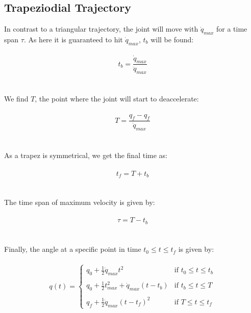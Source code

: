 \documentclass{article}
\begin{document}
	\subsection{Trapeziodial Trajectory}
	In contrast to a triangular trajectory, the joint will move with $\dot{q}_{max}$ for a time span $\tau$. As here it is guaranteed to hit $\dot{q}_{max}$, $t_{b}$ will be found:\\\\
	\begin{equation}
	t_{b} = \frac{\dot{q}_{max}}{\ddot{q}_{max}}
	\end{equation}\\\\
	We find $T$, the point where the joint will start to deaccelerate:\\\\
	\begin{equation}
	T = \frac{q_{f} - q_{f}}{\dot{q}_{max}}
	\end{equation}\\\\
	As a trapez is symmetrical, we get the final time as:\\\\
	\begin{equation}
	t_{f} = T + t_{b}
	\end{equation}\\\\
	The time span of maximum velocity is given by:\\\\
	\begin{equation}
	\tau = T - t_{b}
	\end{equation}\\\\
	Finally, the angle at a specific point in time $t_{0}\leq t \leq t_{f}$ is given by:\\\\
	\begin{equation}
	q(t) =
\left\{
	\begin{array}{ll}
		q_{0}+\frac{1}{2}\ddot{q}_{max}t^{2}  & \mbox{if } t_{0}\leq t \leq t_{b} \\\\
		q_{0}+\frac{1}{2}t_{max}^{2}+ \dot{q}_{max}(t-t_{b}) & \mbox{if } t_{b}\leq t \leq T \\\\
		q_{f}+\frac{1}{2}\ddot{q}_{max}(t-t_{f})^{2} & \mbox{if }T\leq t \leq t_{f}
	\end{array}
\right.
	\end{equation}
	\newpage
\end{document}
